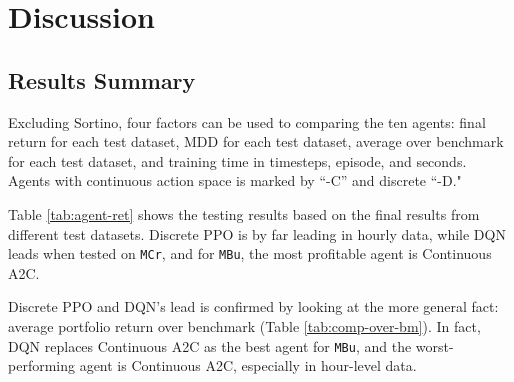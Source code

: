 \chapter{Discussion}
\label{ch:discussion}

\section{Results Summary}

Excluding Sortino, four factors can be used to comparing the ten agents: final return for each test dataset, MDD for each test dataset, average over benchmark for each test dataset, and training time in timesteps, episode, and seconds. Agents with continuous action space is marked by ``-C'' and discrete ``-D."

Table \ref{tab:agent-ret} shows the testing results based on the final results from different test datasets. Discrete PPO is by far leading in hourly data, while DQN leads when tested on \texttt{MCr}, and for \texttt{MBu}, the most profitable agent is Continuous A2C.

Discrete PPO and DQN's lead is confirmed by looking at the more general fact: average portfolio return over benchmark (Table \ref{tab:comp-over-bm}). In fact, DQN replaces Continuous A2C as the best agent for \texttt{MBu}, and the worst-performing agent is Continuous A2C, especially in hour-level data.

